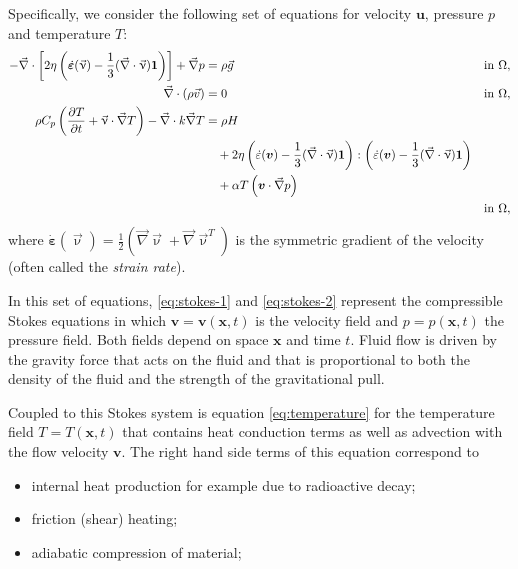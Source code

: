 Specifically, we consider the following set of equations for velocity $\mathbf
u$, pressure $p$ and temperature $T$:
\begin{align}
  \label{eq:stokes-1}
  -\vec\nabla \cdot \left[2\eta \left(\dot{\bm \varepsilon}(\vec \upnu)
                                  - \frac{1}{3}(\vec\nabla \cdot \vec \upnu)\mathbf 1\right)
                \right] + \vec\nabla p &=
  \rho \vec g
  &
  & \textrm{in $\Omega$},
  \\
  \label{eq:stokes-2}
  \vec\nabla \cdot (\rho \vec v) &= 0
  &
  & \textrm{in $\Omega$},
  \\
  \label{eq:temperature}
  \rho C_p \left(\frac{\partial T}{\partial t} + \vec \upnu\cdot\vec\nabla T\right)
  - \vec\nabla\cdot k\vec\nabla T
  &=
  \rho H
  \notag
  \\
  &\quad
  +
  2\eta
  \left(\dot\varepsilon(\bm v) - \frac{1}{3}(\vec\nabla \cdot \vec \upnu)\mathbf 1\right)
  :
  \left(\dot\varepsilon(\bm v) - \frac{1}{3}(\vec\nabla \cdot \vec \upnu)\mathbf 1\right)
  \\
  &\quad
  +\alpha T \left( \bm v \cdot \vec\nabla p \right)
  \notag
  \\
  &\quad
  &
  & \textrm{in $\Omega$},
  \notag
\end{align}
where $\dot{\bm \varepsilon}(\vec\upnu) = \frac{1}{2}(\vec\nabla \vec\upnu + \vec\nabla \vec\upnu^T)$ is the symmetric gradient of the velocity (often called the
\textit{strain rate}).%

In this set of equations, \eqref{eq:stokes-1} and \eqref{eq:stokes-2}
represent the compressible Stokes equations in which $\mathbf v=\mathbf
v(\mathbf x,t)$ is the velocity field and $p=p(\mathbf x,t)$ the pressure
field. Both fields depend on space $\mathbf x$ and time $t$. Fluid flow is
driven by the gravity force that acts on the fluid and that is proportional to
both the density of the fluid and the strength of the gravitational pull.

Coupled to this Stokes system is equation \eqref{eq:temperature} for the
temperature field $T=T(\mathbf x,t)$ that contains heat conduction terms as
well as advection with the flow velocity $\mathbf v$. The right hand side
terms of this equation correspond to
\begin{itemize}
\item internal heat production for example due to radioactive decay;
\item friction (shear) heating;
\item adiabatic compression of material;
\end{itemize}

